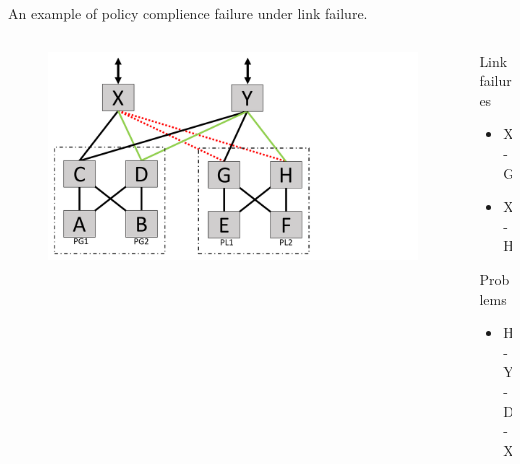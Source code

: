 \begin{frame}{An example of policy complience failure under link failure.}
    \begin{columns}
        \begin{column}{0.45\textwidth}
            \begin{figure}
                \includegraphics[width=1\textwidth,keepaspectratio,frame,clip,trim={0cm 0cm 9cm 0cm}]{figures/ex2_1_failed_links_new_path.pdf}
            \end{figure}
        \end{column}
        \begin{column}{0.50\textwidth}
            \begin{block}{Link failures}
                \begin{itemize}
                    \item X-G
                    \item X-H
                \end{itemize}
            \end{block}
            \begin{block}{Problems}
                \begin{itemize}
                    \item H-Y-D-X
                \end{itemize}
            \end{block}
        \end{column}
    \end{columns}
\end{frame}


